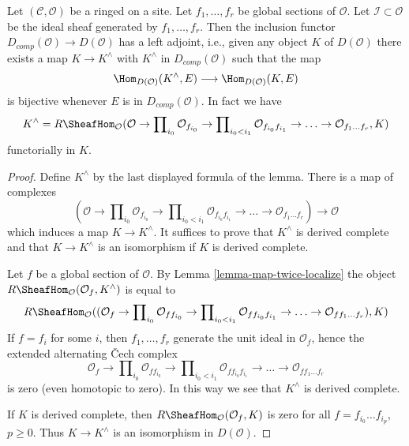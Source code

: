 \begin{lemma}
\label{lemma-derived-completion}
Let $(\mathcal{C}, \mathcal{O})$ be a ringed on a site. Let $f_1, \ldots, f_r$
be global sections of $\mathcal{O}$. Let $\mathcal{I} \subset \mathcal{O}$ be
the ideal sheaf generated by $f_1, \ldots, f_r$.
Then the inclusion functor $D_{comp}(\mathcal{O}) \to D(\mathcal{O})$
has a left adjoint, i.e., given any object $K$ of $D(\mathcal{O})$
there exists a map $K \to K^\wedge$ with $K^\wedge$ in $D_{comp}(\mathcal{O})$
such that the map
$$
\Hom_{D(\mathcal{O})}(K^\wedge, E) \longrightarrow \Hom_{D(\mathcal{O})}(K, E)
$$
is bijective whenever $E$ is in $D_{comp}(\mathcal{O})$. In fact
we have
$$
K^\wedge =
R\SheafHom_\mathcal{O}
(\mathcal{O} \to \prod\nolimits_{i_0} \mathcal{O}_{f_{i_0}} \to
\prod\nolimits_{i_0 < i_1} \mathcal{O}_{f_{i_0}f_{i_1}} \to
\ldots \to \mathcal{O}_{f_1\ldots f_r}, K)
$$
functorially in $K$.
\end{lemma}

\begin{proof}
Define $K^\wedge$ by the last displayed formula of the lemma.
There is a map of complexes
$$
(\mathcal{O} \to \prod\nolimits_{i_0} \mathcal{O}_{f_{i_0}} \to
\prod\nolimits_{i_0 < i_1} \mathcal{O}_{f_{i_0}f_{i_1}} \to
\ldots \to \mathcal{O}_{f_1\ldots f_r}) \longrightarrow \mathcal{O}
$$
which induces a map $K \to K^\wedge$. It suffices to prove that
$K^\wedge$ is derived complete and that $K \to K^\wedge$ is an
isomorphism if $K$ is derived complete.

\medskip\noindent
Let $f$ be a global section of $\mathcal{O}$.
By Lemma \ref{lemma-map-twice-localize} the object
$R\SheafHom_\mathcal{O}(\mathcal{O}_f, K^\wedge)$
is equal to
$$
R\SheafHom_\mathcal{O}(
(\mathcal{O}_f \to \prod\nolimits_{i_0} \mathcal{O}_{ff_{i_0}} \to
\prod\nolimits_{i_0 < i_1} \mathcal{O}_{ff_{i_0}f_{i_1}} \to
\ldots \to \mathcal{O}_{ff_1\ldots f_r}), K)
$$
If $f = f_i$ for some $i$, then $f_1, \ldots, f_r$ generate the
unit ideal in $\mathcal{O}_f$, hence the extended alternating
{\v C}ech complex
$$
\mathcal{O}_f \to \prod\nolimits_{i_0} \mathcal{O}_{ff_{i_0}} \to
\prod\nolimits_{i_0 < i_1} \mathcal{O}_{ff_{i_0}f_{i_1}} \to
\ldots \to \mathcal{O}_{ff_1\ldots f_r}
$$
is zero (even homotopic to zero). In this way we see that $K^\wedge$
is derived complete.

\medskip\noindent
If $K$ is derived complete, then $R\SheafHom_\mathcal{O}(\mathcal{O}_f, K)$
is zero for all $f = f_{i_0} \ldots f_{i_p}$, $p \geq 0$. Thus
$K \to K^\wedge$ is an isomorphism in $D(\mathcal{O})$.
\end{proof}

